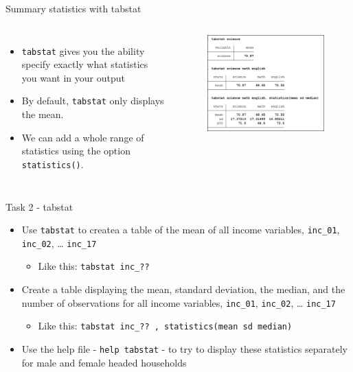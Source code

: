 \documentclass[aspectratio=169]{beamer}
\begin{document}
\begin{frame}[fragile]{Summary statistics with tabstat}
	\begin{columns}[c]
		\begin{itemize}
			\item \texttt{tabstat} gives you the ability specify exactly what statistics you want in your output
			\item By default, \texttt{tabstat} only displays the mean. 
			\item We can add a whole range of statistics using the option \texttt{statistics()}. 			
		\end{itemize}
		\begin{figure}
			\centering
			\includegraphics[width=\linewidth]{img/tabstat}
		\end{figure}
	\end{columns}
\end{frame}

\begin{frame}{Task 2 - tabstat}
	\begin{itemize}
		\item Use \texttt{tabstat} to createa a table of the mean of all income variables, \texttt{inc\_01}, \texttt{inc\_02}, … \texttt{inc\_17}
		\begin{itemize}
			\item Like this: \texttt{tabstat inc\_??}
		\end{itemize}
		\item Create a table displaying the mean, standard deviation, the median, and the number of observations for all income variables, \texttt{inc\_01}, \texttt{inc\_02}, … \texttt{inc\_17}
		\begin{itemize}
			\item Like this: \texttt{tabstat inc\_?? , statistics(mean sd median)} 
		\end{itemize}
		\item Use the help file - \texttt{help tabstat} - to try to display these statistics separately for male and female headed households
	\end{itemize}
\end{frame}
\end{document}
